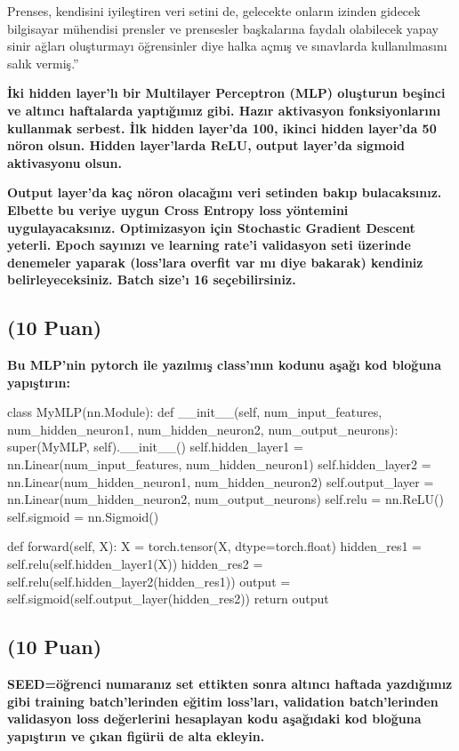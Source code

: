 \documentclass[11pt]{article}
\begin{document}
Prenses, kendisini iyileştiren veri setini de, gelecekte onların izinden gidecek bilgisayar mühendisi prensler ve prensesler başkalarına faydalı olabilecek yapay sinir ağları oluşturmayı öğrensinler diye halka açmış ve sınavlarda kullanılmasını salık vermiş.''

\textbf{İki hidden layer'lı bir Multilayer Perceptron (MLP) oluşturun beşinci ve altıncı haftalarda yaptığımız gibi. Hazır aktivasyon fonksiyonlarını kullanmak serbest. İlk hidden layer'da 100, ikinci hidden layer'da 50 nöron olsun. Hidden layer'larda ReLU, output layer'da sigmoid aktivasyonu olsun.}

\textbf{Output layer'da kaç nöron olacağını veri setinden bakıp bulacaksınız. Elbette bu veriye uygun Cross Entropy loss yöntemini uygulayacaksınız. Optimizasyon için Stochastic Gradient Descent yeterli. Epoch sayınızı ve learning rate'i validasyon seti üzerinde denemeler yaparak (loss'lara overfit var mı diye bakarak) kendiniz belirleyeceksiniz. Batch size'ı 16 seçebilirsiniz.}

\subsection{(10 Puan)} \textbf{Bu MLP'nin pytorch ile yazılmış class'ının kodunu aşağı kod bloğuna yapıştırın:}

\begin{python}
class MyMLP(nn.Module):
    def __init__(self, num_input_features, num_hidden_neuron1, num_hidden_neuron2, num_output_neurons):
        super(MyMLP, self).__init__()
        self.hidden_layer1 = nn.Linear(num_input_features, num_hidden_neuron1)
        self.hidden_layer2 = nn.Linear(num_hidden_neuron1, num_hidden_neuron2)
        self.output_layer = nn.Linear(num_hidden_neuron2, num_output_neurons)
        self.relu = nn.ReLU()
        self.sigmoid = nn.Sigmoid()

    def forward(self, X):
        X = torch.tensor(X, dtype=torch.float)
        hidden_res1 = self.relu(self.hidden_layer1(X))
        hidden_res2 = self.relu(self.hidden_layer2(hidden_res1))
        output = self.sigmoid(self.output_layer(hidden_res2))
        return output
\end{python}

\subsection{(10 Puan)} \textbf{SEED=öğrenci numaranız set ettikten sonra altıncı haftada yazdığımız gibi training batch'lerinden eğitim loss'ları, validation batch'lerinden validasyon loss değerlerini hesaplayan kodu aşağıdaki kod bloğuna yapıştırın ve çıkan figürü de alta ekleyin.}
\end{document}
